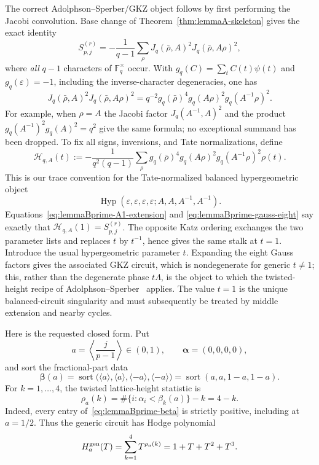The correct Adolphson--Sperber/GKZ object follows by first performing the
Jacobi convolution.  Base change of
Theorem~\ref{thm:lemmaA-skeleton} gives the exact identity
\begin{equation}
 S_{p,j}^{(r)}=-\frac1{q-1}\sum_\rho
 J_q(\bar\rho,A)^2J_q(\bar\rho,A\rho)^2,
 \label{eq:lemmaBprime-A1-extension}
\end{equation}
where \emph{all} $q-1$ characters of $\mathbb F_q^\times$ occur.  With
$g_q(C)=\sum_tC(t)\psi(t)$ and $g_q(\varepsilon)=-1$, including the
inverse-character degeneracies, one has
\begin{equation}
 J_q(\bar\rho,A)^2J_q(\bar\rho,A\rho)^2
 =q^{-2}g_q(\bar\rho)^4g_q(A\rho)^2g_q(A^{-1}\rho)^2.
 \label{eq:lemmaBprime-gauss-eight}
\end{equation}
For example, when $\rho=A$ the Jacobi factor
$J_q(A^{-1},A)^2$ and the product $g_q(A^{-1})^2g_q(A)^2=q^2$
give the same formula; no exceptional summand has been dropped.
To fix all signs, inversions, and Tate normalizations, define
\[
 \mathcal H_{q,A}(t):=-\frac{1}{q^2(q-1)}
 \sum_\rho g_q(\bar\rho)^4g_q(A\rho)^2
                    g_q(A^{-1}\rho)^2\rho(t).
\]
This is our trace convention for the Tate-normalized balanced
hypergeometric object
\begin{equation}
 \operatorname {Hyp}(\varepsilon,\varepsilon,\varepsilon,\varepsilon;
 A,A,A^{-1},A^{-1}).
 \label{eq:lemmaBprime-hyp}
\end{equation}
Equations~\eqref{eq:lemmaBprime-A1-extension} and
\eqref{eq:lemmaBprime-gauss-eight} say exactly that
$\mathcal H_{q,A}(1)=S_{p,j}^{(r)}$.  The opposite Katz ordering exchanges
the two parameter lists and replaces $t$ by $t^{-1}$, hence gives the same
stalk at $t=1$.
Introduce the usual hypergeometric parameter $t$.  Expanding the eight
Gauss factors gives the associated GKZ circuit, which is nondegenerate for
generic $t\ne1$; this, rather than the degenerate phase $t\Lambda$, is the
object to which the twisted-height recipe of
Adolphson--Sperber~\cite{AS1993} applies.  The value $t=1$ is the unique
balanced-circuit singularity and must subsequently be treated by middle
extension and nearby cycles.

Here is the requested closed form.  Put
\[
 a=\left\langle\frac{j}{p-1}\right\rangle\in(0,1),\qquad
 \boldsymbol\alpha=(0,0,0,0),
\]
and sort the fractional-part data
\begin{equation}
 \boldsymbol\beta(a)
 =\operatorname {sort}\bigl(
   \langle a\rangle,\langle a\rangle,
   \langle-a\rangle,\langle-a\rangle\bigr)
 =\operatorname {sort}(a,a,1-a,1-a).
 \label{eq:lemmaBprime-beta}
\end{equation}
For $k=1,\ldots,4$, the twisted lattice-height statistic is
\begin{equation}
 \rho_a(k)=\#\{i:\alpha_i<\beta_k(a)\}-k=4-k.
 \label{eq:lemmaBprime-rho}
\end{equation}
Indeed, every entry of~\eqref{eq:lemmaBprime-beta} is strictly positive,
including at $a=1/2$.  Thus the generic circuit has Hodge polynomial
\begin{equation}
 H_a^{\rm gen}(T)=\sum_{k=1}^4T^{\rho_a(k)}
 =1+T+T^2+T^3.
 \label{eq:lemmaBprime-generic-HP}
\end{equation}

